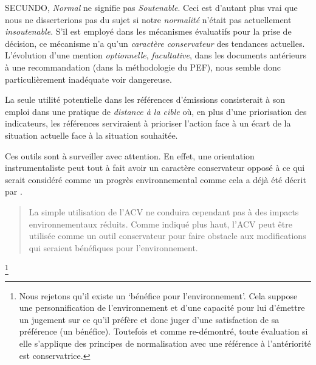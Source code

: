 SECUNDO, \textit{Normal} ne signifie pas \textit{Soutenable}.
Ceci est d'autant plus vrai que nous ne disserterions pas du sujet si notre \emph{normalité} n'était pas actuellement \emph{insoutenable}.
S'il est employé dans les mécanismes évaluatifs pour la prise de décision, ce mécanisme n'a qu'un \emph{caractère conservateur} des tendances actuelles.
L'évolution d'une mention \emph{optionnelle}, \emph{facultative}, dans les documents antérieurs à une recommandation (dans la méthodologie du PEF), nous semble donc particulièrement inadéquate voir dangereuse.

La seule utilité potentielle dans les références d'émissions consisterait à son emploi dans une pratique de \emph{distance à la cible} où, en plus d'une priorisation des indicateurs, les références serviraient à prioriser l'action face à un écart de la situation actuelle face à la situation souhaitée.

Ces outils sont à surveiller avec attention.
En effet, une orientation instrumentaliste peut tout à fait avoir un caractère conservateur opposé à ce qui serait considéré comme un progrès environnemental comme cela a déjà été décrit par \citeauthor{finnveden_limitations_2000}.
\blockcquote[traduction]{finnveden_limitations_2000}{
La simple utilisation de l'ACV ne conduira cependant pas à des impacts environnementaux réduits.
Comme indiqué plus haut, l'ACV peut être utilisée comme un outil conservateur pour faire obstacle aux modifications qui seraient bénéfiques pour l'environnement.
}\footnote{Nous rejetons qu'il existe un `bénéfice pour l'environnement'.
Cela suppose une personnification de l'environnement et d'une capacité pour lui d'émettre un jugement sur ce qu'il préfère et donc juger d'une satisfaction de sa préférence (un bénéfice).
Toutefois et comme re-démontré, toute évaluation si elle s'applique des principes de normalisation avec une référence à l'antériorité est conservatrice.}